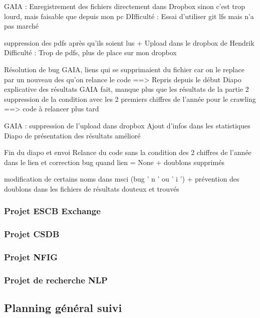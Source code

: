 GAIA : Enregistrement des fichiers directement dans Dropbox sinon c’est trop lourd, mais faisable que depuis mon pc
DIfficulté : Essai d’utiliser git lfs mais n’a pas marché

suppression des pdfs après qu’ils soient lus + Upload dans le dropbox de Hendrik
Difficulté : Trop de pdfs, plus de place sur mon dropbox

Résolution de bug GAIA, liens qui se supprimaient du fichier car on le replace par un nouveau des qu’on relance le code ==> Repris depuis le début
Diapo explicative des résultats GAIA fait, manque plus que les résultats de la partie 2
suppression de la condition avec les 2 premiers chiffres de l’année pour le crawling ==> code à relancer plus tard

GAIA : suppression de l’upload dans dropbox
Ajout d’infos dans les statistiques
Diapo de présentation des résultats amélioré

Fin du diapo et envoi
Relance du code sans la condition des 2 chiffres de l’année dans le lien et correction bug quand lien = None + doublons supprimés

modification de certains noms dans msci (bug ' n ' ou ' i ') + prévention des doublons dans les fichiers de résultats douteux et trouvés



\subsubsection{Projet ESCB Exchange}

\subsubsection{Projet CSDB}

\subsubsection{Projet NFIG}

\subsubsection{Projet de recherche NLP}

\subsection{Planning général suivi}